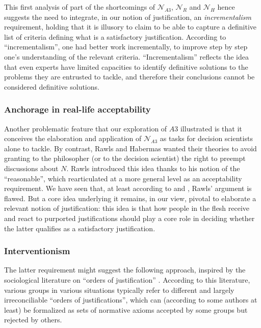 \documentclass[preprint, french, english, 11pt, authoryear]{elsarticle}%
\begin{document}
This first analysis of part of the shortcomings of $\mathscr{N}_{A3}$, $\mathscr{N}_{R}$ and $\mathscr{N}_{H}$ hence suggests the need to integrate, in our notion of justification, an \emph{incrementalism} requirement, holding that it is illusory to claim to be able to capture a definitive list of criteria defining what is a satisfactory justification. According to “incrementalism”, one had better work incrementally, to improve step by step one's understanding of the relevant criteria. “Incrementalism” reflects the idea that even experts have limited capacities to identify definitive solutions to the problems they are entrusted to tackle, and therefore their conclusions cannot be considered definitive solutions.

\subsubsection{Anchorage in real-life acceptability}
Another problematic feature that our exploration of $A3$ illustrated is that it conceives the elaboration and application of $\mathscr{N}_{A3}$ as tasks for decision scientists alone to tackle. By contrast, Rawls and Habermas wanted their theories to avoid granting to the philosopher (or to the decision scientist) the right to preempt discussions about $N$. Rawls introduced this idea thanks to his notion of the ``reasonable'', which \cite{estlund_democratic_2009} rearticulated at a more general level as an acceptability requirement. We have seen that, at least according to \cite{habermas_reconciliation_1995} and \cite{estlund_democratic_2009}, Rawls' argument is flawed. But a core idea underlying it remains, in our view, pivotal to elaborate a relevant notion of justification: this idea is that how people in the flesh receive and react to purported justifications should play a core role in deciding whether the latter qualifies as a satisfactory justification.

\subsubsection{Interventionism}
The latter requirement might suggest the following approach, inspired by the sociological literature on “orders of justification” \citep{boltanski_justification_2006}. According to this literature, various groups in various situations typically refer to different and largely irreconciliable “orders of justifications”, which can (according to some authors at least) be formalized as sets of normative axioms accepted by some groups but rejected by others.
\end{document}
